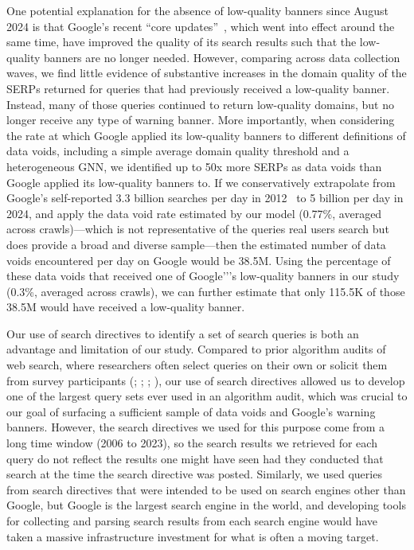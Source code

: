 One potential explanation for the absence of low-quality banners since August 2024 is that Google's recent ``core updates''~\citep{aug2024update}, which went into effect around the same time, have improved the quality of its search results such that the low-quality banners are no longer needed.
However, comparing across data collection waves, we find little evidence of substantive increases in the domain quality of the SERPs returned for queries that had previously received a low-quality banner.
Instead, many of those queries continued to return low-quality domains, but no longer receive any type of warning banner.
More importantly, when considering the rate at which Google applied its low-quality banners to different definitions of data voids, including a simple average domain quality threshold and a heterogeneous GNN, we identified up to 50x more SERPs as data voids than Google applied its low-quality banners to. 
If we conservatively extrapolate from Google's self-reported 3.3 billion searches per day in 2012~\citep{google2013google} to 5 billion per day in 2024, and apply the data void rate estimated by our model (0.77\%, averaged across crawls)---which is not representative of the queries real users search but does provide a broad and diverse sample---then the estimated number of data voids encountered per day on Google would be 38.5M. 
Using the percentage of these data voids that received one of Google'’'s low-quality banners in our study (0.3\%, averaged across crawls), we can further estimate that only 115.5K of those 38.5M would have received a low-quality banner.

Our use of search directives to identify a set of search queries is both an advantage and limitation of our study. 
Compared to prior algorithm audits of web search, where researchers often select queries on their own or solicit them from survey participants (\cite{ballatore2015google}; \cite{norocel2023google}; \cite{lurie2021searching}; \cite{vanhoof2022searching}), our use of search directives allowed us to develop one of the largest query sets ever used in an algorithm audit, which was crucial to our goal of surfacing a sufficient sample of data voids and Google's warning banners. 
However, the search directives we used for this purpose come from a long time window (2006 to 2023), so the search results we retrieved for each query do not reflect the results one might have seen had they conducted that search at the time the search directive was posted. 
Similarly, we used queries from search directives that were intended to be used on search engines other than Google, but Google is the largest search engine in the world, and developing tools for collecting and parsing search results from each search engine would have taken a massive infrastructure investment for what is often a moving target.

